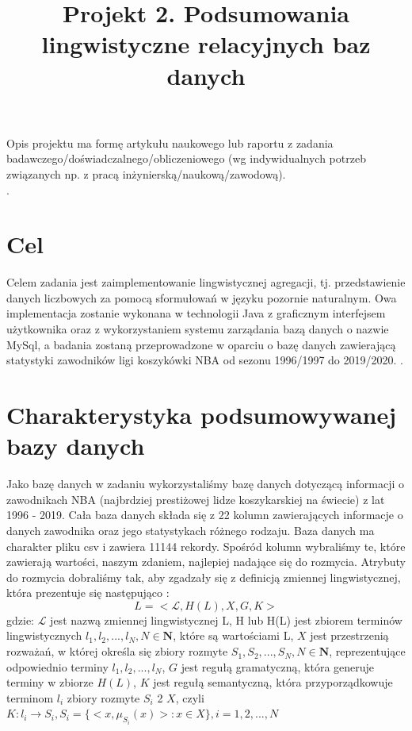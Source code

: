 \documentclass{classrep}
\author{
  \studentinfo{Hubert Gawłowski}{224298} \and
  \studentinfo{Kamil Kiszko-Zgierski}{224328} }
\title{Projekt 2.  Podsumowania lingwistyczne relacyjnych baz danych}
\begin{document}
\maketitle

Opis projektu ma formę artykułu naukowego lub raportu z zadania
badawczego/doświadczalnego/obliczeniowego (wg indywidualnych potrzeb związanych np. z
pracą inżynierską/naukową/zawodową). \\
. 

\section{Cel}
Celem zadania jest zaimplementowanie lingwistycznej agregacji, tj. przedstawienie danych liczbowych za pomocą sformułowań w języku pozornie naturalnym. Owa implementacja zostanie wykonana w technologii Java z graficznym interfejsem użytkownika oraz z wykorzystaniem systemu zarządania bazą danych o nazwie MySql, a badania zostaną przeprowadzone w oparciu o bazę danych zawierającą statystyki zawodników ligi koszykówki NBA od sezonu 1996/1997 do 2019/2020.
\cite{nba_data}.  \\


\section{Charakterystyka podsumowywanej bazy danych}

Jako bazę danych w zadaniu wykorzystaliśmy bazę danych dotyczącą informacji o zawodnikach NBA (najbrdziej prestiżowej lidze koszykarskiej na świecie) z lat 1996 - 2019. Cała baza danych składa się z 22 kolumn zawierających informacje o danych zawodnika oraz jego statystykach różnego rodzaju. Baza danych ma charakter pliku csv i zawiera 11144 rekordy. Spośród kolumn wybraliśmy te, które zawierają wartości, naszym zdaniem, najlepiej nadające się do rozmycia. Atrybuty do rozmycia dobraliśmy tak, aby zgadzały się z definicją zmiennej lingwistycznej, która prezentuje się następująco \cite{niewiadomski19}: 
\begin{equation}
    L=<\mathcal{L}, H(L), X, G, K>
\end{equation}
gdzie: \newline $\mathcal{L}$ jest nazwą zmiennej lingwistycznej L, \newline H lub H(L) jest zbiorem terminów lingwistycznych $l_1, l_2, ..., l_N, N \in \mathbf{N}$, które są wartościami L, \newline $X$ jest przestrzenią rozważań, w której określa się zbiory rozmyte $S_1, S_2,..., S_N, N \in \mathbf{N}$, reprezentujące odpowiednio terminy $l_1, l_2, ..., l_N$, \newline $G$ jest regułą gramatyczną, która generuje terminy w zbiorze $H(L)$, \newline $K$ jest regułą semantyczną, która przyporządkowuje terminom $l_i$ zbiory rozmyte $S_i$ 2 $X$, czyli $K : l_i \rightarrow S_i, S_i = \{<x,\mu_{S_i}(x)> : x \in X \}, i = 1,2,...,N$
\end{document}

